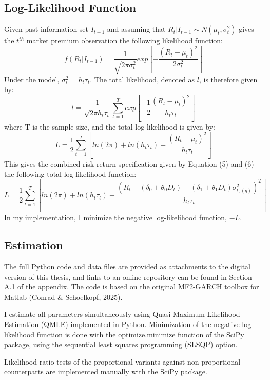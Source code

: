 \documentclass[12pt]{article}
\begin{document}
\subsection{Log-Likelihood Function}
Given past information set $I_{t-1}$ and assuming that $R_t | I_{t-1}\sim N(\mu_t,\sigma_t^2)$ gives the $t^{th}$ market premium observation the following likelihood function:
\begin{equation}
\nonumber
f(R_t|I_{t-1})=\frac{1}{\sqrt{2\pi\sigma_t^2}}exp\left[-\frac{(R_t-\mu_t)^2}{2\sigma_t^2}\right]
\end{equation}
Under the model, $\sigma_t^2=h_t\tau_t$. The total likelihood, denoted as $l$, is therefore given by:
\begin{equation}
\nonumber
l=\frac{1}{\sqrt{2\pi h_t\tau_t}}\sum_{t=1}^Texp\left[-\frac{1}{2}\frac{(R_t-\mu_t)^2}{h_t\tau_t}\right]
\end{equation}
where T is the sample size, and the total log-likelihood is given by:
\begin{equation}
\nonumber
L=\frac{1}{2}\sum_{t=1}^T[ln(2\pi)+ln(h_t\tau_t)+\frac{(R_t-\mu_t)^2}{h_t\tau_t}]
\end{equation}
This gives the combined risk-return specification given by Equation (5) and (6) the following  total log-likelihood function:
\begin{equation}
L=\frac{1}{2}\sum_{t=1}^T[ln(2\pi)+ln(h_t\tau_t)+\frac{(R_t-(\delta_0+\theta_0D_t)-(\delta_1+\theta_1D_t)\sigma_{t,(q)}^2)^2}{h_t\tau_t}]
\end{equation}
In my implementation, I minimize the negative log-likelihood function, $-L$.
\subsection{Estimation}
The full Python code and data files are provided as attachments to the digital version of this thesis, and links to an online repository can be found in Section A.1 of the appendix. The code is based on the original MF2-GARCH toolbox for Matlab (Conrad \& Schoelkopf, 2025).\par
I estimate all parameters simultaneously using Quasi-Maximum Likelihood Estimation (QMLE) implemented in Python. Minimization of the negative log-likelihood function is done with the optimize.minimize function of the SciPy package, using the sequential least squares programming (SLSQP) option.\par
Likelihood ratio tests of the proportional variants against non-proportional counterparts are implemented manually with the SciPy package. 
\end{document}
